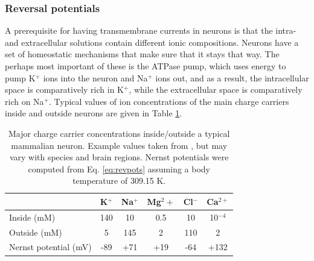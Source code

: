 \subsubsection{Reversal potentials}
A prerequisite for having transmembrane currents in neurons is that the intra- and extracellular solutions contain different ionic compositions. Neurons have a set of homeostatic mechanisms that make sure that it stays that way. The perhaps most important of these is the ATPase pump, which uses energy to pump K$^+$ ions into the neuron and Na$^+$ ions out, and as a result, the intracellular space is comparatively rich in K$^+$, while the extracellular space is comparatively rich on Na$^+$. Typical values of ion concentrations of the main charge carriers inside and outside neurons are given in Table \ref{table:ion-concentrations}.

\begin{table}[h]
\centering
\caption{Major charge carrier concentrations inside/outside a typical mammalian neuron. Example values taken from \cite{Wu2019}, but may vary with species and brain regions. Nernst potentials were computed from Eq. \ref{eq:revpots} assuming a body temperature of 309.15 K.}
\label{table:ion-concentrations}
{\begin{tabular}{lccccc}\toprule
						    & 	K$^+$	&	Na$^+$	&	Mg$^2+$	  &	Cl$^-$	&	Ca$^{2+}$	 \\ \midrule
Inside (mM)				    & 140		&		10	&		0.5	&	10		&  	10$^{-4}$	  	\\
Outside (mM)			           & 5			&		145	&		2	&	110 		&		2		  	\\
Nernst potential (mV)		    &	-89		&	    	+71	&		+19	&	-64		&		+132 		  	\\
\bottomrule
\end{tabular}}{}
\end{table}

